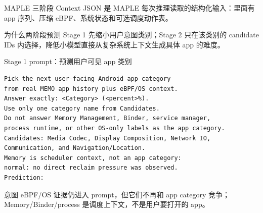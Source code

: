 \documentclass[UTF8,aspectratio=169,10pt]{ctexbeamer}
\begin{document}
\begin{frame}{MAPLE 三阶段}
  {\scriptsize Context JSON 是 MAPLE 每次推理读取的结构化输入：里面有 app 序列、压缩 eBPF、系统状态和可选调度动作表。}
  \vspace{0.35em}
  \centering
  \vspace{0.5em}
  \begin{block}{为什么两阶段预测}
    Stage 1 先缩小用户意图类别；Stage 2 只在该类别的 candidate IDs 内选择，降低小模型直接从复杂系统上下文生成具体 app 的难度。
  \end{block}
\end{frame}

\begin{frame}[fragile]{Stage 1 prompt：预测用户可见 app 类别}
\begin{lstlisting}
Pick the next user-facing Android app category
from real MEMO app history plus eBPF/OS context.
Answer exactly: <Category> (<percent>%).
Use only one category name from Candidates.
Do not answer Memory Management, Binder, service manager,
process runtime, or other OS-only labels as the app category.
Candidates: Media Codec, Display Composition, Network IO,
Communication, and Navigation/Location.
Memory is scheduler context, not an app category:
normal: no direct reclaim pressure was observed.
Prediction:
\end{lstlisting}
  \begin{alertblock}{意图}
    eBPF/OS 证据仍进入 prompt，但它们不再和 app category 竞争；Memory/Binder/process 是调度上下文，不是用户要打开的 app。
  \end{alertblock}
\end{frame}
\end{document}

